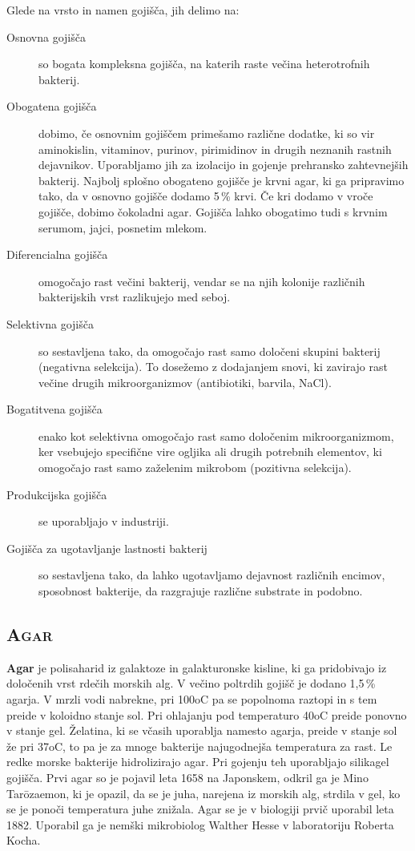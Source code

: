 \documentclass[12pt, a4paper, oneside]{report}
\begin{document}
Glede na vrsto in namen gojišča, jih delimo na:
\begin{description}
\item[Osnovna gojišča] so bogata kompleksna gojišča, na katerih raste večina heterotrofnih bakterij.
\item[Obogatena gojišča] dobimo, če osnovnim gojiščem primešamo različne dodatke, ki so vir aminokislin, vitaminov, purinov, pirimidinov in drugih neznanih rastnih dejavnikov. Uporabljamo jih za izolacijo in gojenje prehransko zahtevnejših bakterij. Najbolj splošno obogateno gojišče je krvni agar, ki ga pripravimo tako, da v osnovno gojišče dodamo 5\,\% krvi. Če kri dodamo v vroče gojišče, dobimo čokoladni agar. Gojišča lahko obogatimo tudi s krvnim serumom, jajci, posnetim mlekom.
\item[Diferencialna gojišča] omogočajo rast večini bakterij, vendar se na njih kolonije različnih bakterijskih vrst razlikujejo med seboj.
\item[Selektivna gojišča] so sestavljena tako, da omogočajo rast samo določeni skupini bakterij (negativna selekcija). To dosežemo z dodajanjem snovi, ki zavirajo rast večine drugih mikroorganizmov (antibiotiki, barvila, NaCl).
\item[Bogatitvena gojišča] enako kot selektivna omogočajo rast samo določenim mikroorganizmom, ker vsebujejo specifične vire ogljika ali drugih potrebnih elementov, ki omogočajo rast samo zaželenim mikrobom (pozitivna selekcija).
\item[Produkcijska gojišča] se uporabljajo v industriji.
\item[Gojišča za ugotavljanje lastnosti bakterij] so sestavljena tako, da lahko ugotavljamo dejavnost različnih encimov, sposobnost bakterije, da razgrajuje različne substrate in podobno.
\end{description}

\subsection{\textsc{Agar}}

\textbf{Agar} je polisaharid iz galaktoze in galakturonske kisline, ki ga pridobivajo iz določenih vrst rdečih morskih alg. V večino poltrdih gojišč je dodano 1,5\,\% agarja. V mrzli vodi nabrekne, pri 100oC pa se popolnoma raztopi in s tem preide v koloidno stanje sol. Pri ohlajanju pod temperaturo 40oC preide ponovno v stanje gel. Želatina, ki se včasih uporablja namesto agarja, preide v stanje sol že pri 37oC, to pa je za mnoge bakterije najugodnejša temperatura za rast. Le redke morske bakterije hidrolizirajo agar. Pri gojenju teh uporabljajo silikagel gojišča. Prvi agar so je pojavil leta 1658 na Japonskem, odkril ga je Mino Tarōzaemon, ki je opazil, da se je juha, narejena iz morskih alg, strdila v gel, ko se je ponoči temperatura juhe znižala. Agar se je v biologiji prvič uporabil leta 1882. Uporabil ga je nemški mikrobiolog Walther Hesse v laboratoriju Roberta Kocha.
\end{document}
